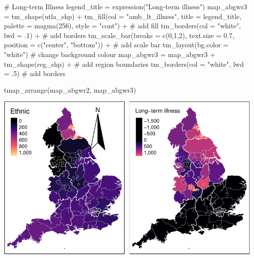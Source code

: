 \documentclass[
  letterpaper,
  DIV=11,
  numbers=noendperiod,
  oneside]{scrreprt}
\newenvironment{Shaded}{\begin{snugshade}}{\end{snugshade}}
\newcommand{\AttributeTok}[1]{\textcolor[rgb]{0.40,0.45,0.13}{#1}}
\newcommand{\CommentTok}[1]{\textcolor[rgb]{0.37,0.37,0.37}{#1}}
\newcommand{\DecValTok}[1]{\textcolor[rgb]{0.68,0.00,0.00}{#1}}
\newcommand{\FloatTok}[1]{\textcolor[rgb]{0.68,0.00,0.00}{#1}}
\newcommand{\FunctionTok}[1]{\textcolor[rgb]{0.28,0.35,0.67}{#1}}
\newcommand{\NormalTok}[1]{\textcolor[rgb]{0.00,0.23,0.31}{#1}}
\newcommand{\OtherTok}[1]{\textcolor[rgb]{0.00,0.23,0.31}{#1}}
\newcommand{\SpecialCharTok}[1]{\textcolor[rgb]{0.37,0.37,0.37}{#1}}
\newcommand{\StringTok}[1]{\textcolor[rgb]{0.13,0.47,0.30}{#1}}
\begin{document}
\begin{Shaded}
\begin{Highlighting}[]
  \CommentTok{\# Long{-}term Illness}
\NormalTok{legend\_title }\OtherTok{=} \FunctionTok{expression}\NormalTok{(}\StringTok{"Long{-}term illness"}\NormalTok{)}
\NormalTok{map\_abgwr3 }\OtherTok{=} \FunctionTok{tm\_shape}\NormalTok{(utla\_shp) }\SpecialCharTok{+}
  \FunctionTok{tm\_fill}\NormalTok{(}\AttributeTok{col =} \StringTok{"amb\_lt\_illness"}\NormalTok{, }\AttributeTok{title =}\NormalTok{ legend\_title, }\AttributeTok{palette =} \FunctionTok{magma}\NormalTok{(}\DecValTok{256}\NormalTok{), }\AttributeTok{style =} \StringTok{"cont"}\NormalTok{) }\SpecialCharTok{+} \CommentTok{\# add fill}
  \FunctionTok{tm\_borders}\NormalTok{(}\AttributeTok{col =} \StringTok{"white"}\NormalTok{, }\AttributeTok{lwd =}\NormalTok{ .}\DecValTok{1}\NormalTok{)  }\SpecialCharTok{+} \CommentTok{\# add borders}
  \FunctionTok{tm\_scale\_bar}\NormalTok{(}\AttributeTok{breaks =} \FunctionTok{c}\NormalTok{(}\DecValTok{0}\NormalTok{,}\DecValTok{1}\NormalTok{,}\DecValTok{2}\NormalTok{), }\AttributeTok{text.size =} \FloatTok{0.7}\NormalTok{, }\AttributeTok{position =}  \FunctionTok{c}\NormalTok{(}\StringTok{"center"}\NormalTok{, }\StringTok{"bottom"}\NormalTok{)) }\SpecialCharTok{+} \CommentTok{\# add scale bar}
  \FunctionTok{tm\_layout}\NormalTok{(}\AttributeTok{bg.color =} \StringTok{"white"}\NormalTok{) }\CommentTok{\# change background colour}
\NormalTok{map\_abgwr3 }\OtherTok{=}\NormalTok{ map\_abgwr3 }\SpecialCharTok{+} \FunctionTok{tm\_shape}\NormalTok{(reg\_shp) }\SpecialCharTok{+} \CommentTok{\# add region boundaries}
  \FunctionTok{tm\_borders}\NormalTok{(}\AttributeTok{col =} \StringTok{"white"}\NormalTok{, }\AttributeTok{lwd =}\NormalTok{ .}\DecValTok{5}\NormalTok{) }\CommentTok{\# add borders}

\FunctionTok{tmap\_arrange}\NormalTok{(map\_abgwr2, map\_abgwr3)}
\end{Highlighting}
\end{Shaded}

\includegraphics{09-gwr_files/figure-pdf/unnamed-chunk-17-1.pdf}
\end{document}
